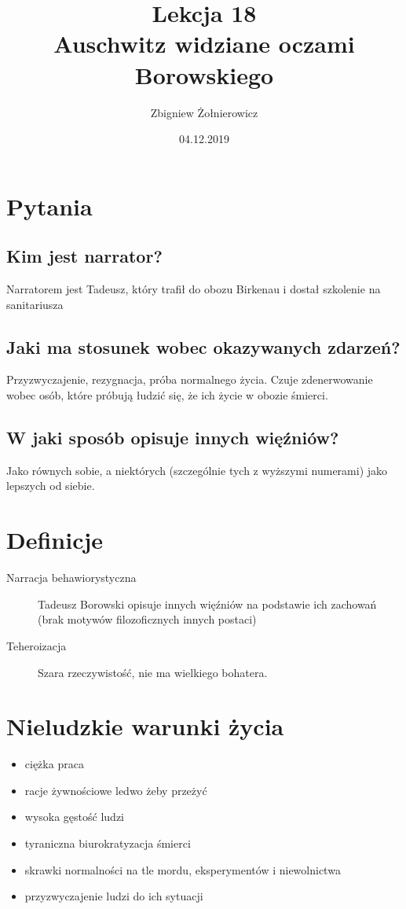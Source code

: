 \documentclass[a4paper]{article}
\begin{document}
\title{{\huge Lekcja 18} \\
{\large Auschwitz widziane oczami Borowskiego}}
\author{Zbigniew Żołnierowicz}
\date{04.12.2019}
\maketitle
\section{Pytania}
\subsection{Kim jest narrator?}
Narratorem jest Tadeusz, który trafił do obozu Birkenau i dostał szkolenie na sanitariusza
\subsection{Jaki ma stosunek wobec okazywanych zdarzeń?}
Przyzwyczajenie, rezygnacja, próba normalnego życia. Czuje zdenerwowanie wobec osób, które próbują łudzić się, że ich życie w obozie śmierci.
\subsection{W jaki sposób opisuje innych więźniów?}
Jako równych sobie, a niektórych (szczególnie tych z wyższymi numerami) jako lepszych od siebie.
\section{Definicje}
\begin{description}
    \item[Narracja behawiorystyczna] Tadeusz Borowski opisuje innych więźniów na podstawie ich zachowań (brak motywów filozoficznych innych postaci)
    \item[Teheroizacja] Szara rzeczywistość, nie ma wielkiego bohatera.
\end{description}
\section{Nieludzkie warunki życia}
\begin{itemize}
    \item ciężka praca
    \item racje żywnościowe ledwo żeby przeżyć
    \item wysoka gęstość ludzi
    \item tyraniczna biurokratyzacja śmierci
    \item skrawki normalności na tle mordu, eksperymentów i niewolnictwa
    \item przyzwyczajenie ludzi do ich sytuacji
\end{itemize}
\end{document}
